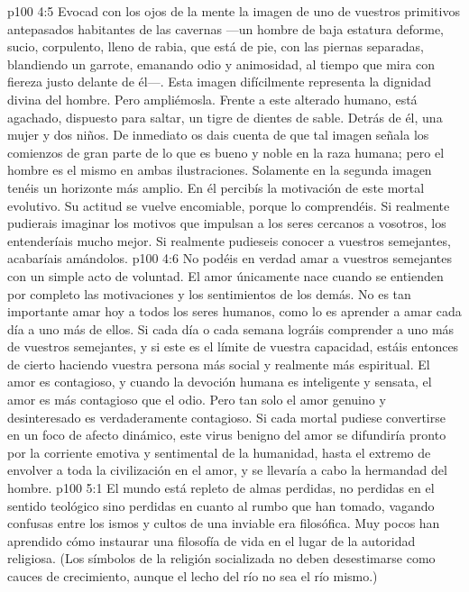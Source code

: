 \vs p100 4:5 Evocad con los ojos de la mente la imagen de uno de vuestros primitivos antepasados habitantes de las cavernas ---un hombre de baja estatura deforme, sucio, corpulento, lleno de rabia, que está de pie, con las piernas separadas, blandiendo un garrote, emanando odio y animosidad, al tiempo que mira con fiereza justo delante de él---. Esta imagen difícilmente representa la dignidad divina del hombre. Pero ampliémosla. Frente a este alterado humano, está agachado, dispuesto para saltar, un tigre de dientes de sable. Detrás de él, una mujer y dos niños. De inmediato os dais cuenta de que tal imagen señala los comienzos de gran parte de lo que es bueno y noble en la raza humana; pero el hombre es el mismo en ambas ilustraciones. Solamente en la segunda imagen tenéis un horizonte más amplio. En él percibís la motivación de este mortal evolutivo. Su actitud se vuelve encomiable, porque lo comprendéis. Si realmente pudierais imaginar los motivos que impulsan a los seres cercanos a vosotros, los entenderíais mucho mejor. Si realmente pudieseis conocer a vuestros semejantes, acabaríais amándolos.
\vs p100 4:6 No podéis en verdad amar a vuestros semejantes con un simple acto de voluntad. El amor únicamente nace cuando se entienden por completo las motivaciones y los sentimientos de los demás. No es tan importante amar hoy a todos los seres humanos, como lo es aprender a amar cada día a uno más de ellos. Si cada día o cada semana lográis comprender a uno más de vuestros semejantes, y si este es el límite de vuestra capacidad, estáis entonces de cierto haciendo vuestra persona más social y realmente más espiritual. El amor es contagioso, y cuando la devoción humana es inteligente y sensata, el amor es más contagioso que el odio. Pero tan solo el amor genuino y desinteresado es verdaderamente contagioso. Si cada mortal pudiese convertirse en un foco de afecto dinámico, este virus benigno del amor se difundiría pronto por la corriente emotiva y sentimental de la humanidad, hasta el extremo de envolver a toda la civilización en el amor, y se llevaría a cabo la hermandad del hombre.
\vs p100 5:1 El mundo está repleto de almas perdidas, no perdidas en el sentido teológico sino perdidas en cuanto al rumbo que han tomado, vagando confusas entre los ismos y cultos de una inviable era filosófica. Muy pocos han aprendido cómo instaurar una filosofía de vida en el lugar de la autoridad religiosa. (Los símbolos de la religión socializada no deben desestimarse como cauces de crecimiento, aunque el lecho del río no sea el río mismo.)
